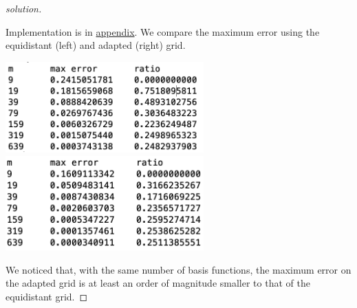 \documentclass[11pt]{article}
\begin{document}
\begin{proof}[solution]
\begin{center}
    \end{center}
    Implementation is in \hyperref[q3code]{appendix}. We compare the maximum error using the equidistant (left) and adapted (right) grid.
    \begin{center}
        \includegraphics[width=3in]{q3_equidistant} 
        \quad\quad
        \includegraphics[width=3in]{q3_abslogit}
    \end{center}
    We noticed that, with the same number of basis functions, the maximum error on the adapted grid is at least an order of magnitude smaller to that of the equidistant grid.
\end{proof}
\end{document}
